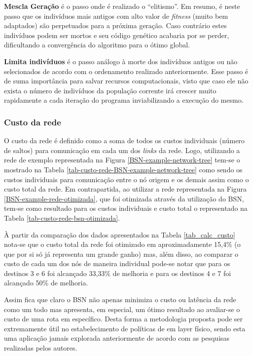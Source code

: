 \textbf{Mescla Geração} é o passo onde é realizado o ``elitismo''. Em resumo, é neste passo que os indivíduos mais antigos com alto valor de \emph{fitness} (muito bem adaptados) são perpetuados para a próxima geração. Caso contrário estes indivíduos podem ser mortos e seu código genético acabaria por se perder, dificultando a convergência do algoritmo para o ótimo global.

\textbf{Limita indivíduos} é o passo análogo à morte dos indivíduos antigos ou não selecionados de acordo com o ordenamento realizado anteriormente. Esse passo é de suma importância para salvar recursos computacionais, visto que caso ele não exista o número de indivíduos da população corrente irá crescer muito rapidamente a cada iteração do programa inviabilizando a execução do mesmo.

\subsubsection{Custo da rede}
\label{subsection-custo-da-rede}
O custo da rede é definido como a soma de todos os custos individuais (número de saltos) para comunicação em cada um dos \emph{links} da rede. Logo, utilizando a rede de exemplo representada na Figura \ref{BSN-example-network-tree} tem-se o mostrado na Tabela \ref{tab-custo-rede-BSN-example-network-tree} como sendo os custos individuais para comunicação entre o nó origem e os demais assim como o custo total da rede. Em contrapartida, ao utilizar a rede representada na Figura \ref{BSN-example-rede-otimizada}, que foi otimizada através da utilização do BSN, tem-se como resultado para os custos individuais e custo total o representado na Tabela \ref{tab-custo-rede-bsn-otimizada}.

À partir da comparação dos dados apresentados na Tabela \ref{tab_calc_custo} nota-se que o custo total da rede foi otimizado em aproximadamente 15,4\% (o que por si só já representa um grande ganho) mas, além disso, ao comparar o custo de cada um dos nós de maneira individual pode-se notar que para os destinos 3 e 6 foi alcançado 33,33\% de melhoria e para os destinos 4 e 7 foi alcançado 50\% de melhoria.

Assim fica que claro o BSN não apenas minimiza o custo ou latência da rede como um todo mas apresenta, em especial, um ótimo resultado ao avaliar-se o custo de uma rota em específico. Desta forma a metodologia proposta pode ser extremamente útil no estabelecimento de políticas de  em layer físico, sendo esta uma aplicação jamais explorada anteriormente de acordo com as pesquisas realizadas pelos autores.

